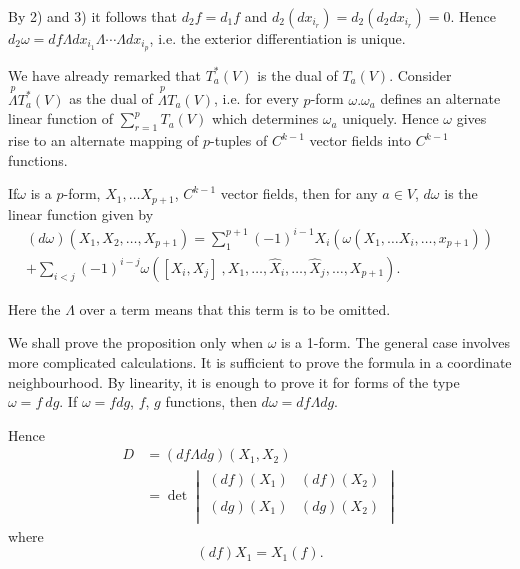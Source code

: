 By 2) and 3) it follows that $d_2 f = d_1 f$ and $d_2 (dx_{i_{r}}) =
d_2 (d_2dx_{i_{r}} ) = 0$. Hence $d_2 \omega = df \Lambda dx_{i_{1}}
\Lambda \cdots \Lambda dx_{i_{p}}$, i.e. the exterior differentiation
is unique. 

We have already remarked that $T^*_a (V)$ is the dual of $T_a
(V)$. Consider $\overset{p}{\Lambda} T^*_a (V)$ as  the dual of
$\overset{p}{\Lambda} T_a (V)$, i.e. for every $p$-form
$\omega. \omega_a$ defines an alternate linear function of $\sum
\limits^{p}_{r=1} T_a (V)$ which determines $\omega_a$ uniquely. Hence
$\omega$ gives rise to an alternate mapping of $p$-tuples  of $C^{k-1}$ vector
fields into $C^{k-1}$ functions. 

\setcounter{proposition}{0}
\begin{proposition}\label{chap2:sec4:prop1}%
  If\pageoriginale $\omega$  is a $p$-form, $X_1, \ldots X_{p+1}$, $C^{k-1}$ vector
  fields, then for any $a \in V$, $d \omega$ is the linear function
  given by  
  \begin{multline*}
    (d \omega ) (X_1, X_2, \ldots , X_{p+1})  = \sum^{p+1}_{1}
    (-1)^{i-1} X_i (\omega (X_1, \ldots X_i, \ldots ,x_{p+1}))\\ 
    +  \sum_{i
      < j} (-1)^{i -j} \omega ([ X_i, X_j ] ~ , X_1, \dots ,
    \hat{X}_i, \dots, \hat{X}_j, \dots, X_{p+1}).  
  \end{multline*}
\end{proposition}

Here the $\Lambda$ over a term means that this term is to be omitted.

We shall prove the proposition only when $\omega$ is a 1-form. The
general case involves more complicated calculations. It is sufficient
to prove the formula in a coordinate neighbourhood. By linearity, it
is enough to prove it for forms of the type $\omega = f\ dg$. If
$\omega = f dg$, $f$, $g$ functions, then $d \omega = df \Lambda dg$. 

Hence
\begin{align*}
  D &= (df \Lambda dg) (X_1, X_2) \\
  &= \det  \begin{vmatrix} (df) (X_1) &  (df) (X_2) \\  & \\ (dg)
    (X_1) & (dg) (X_2) \\ 
   \end{vmatrix} 
\end{align*}
where
$$
(df)  X_1 = X_1 (f).
$$

